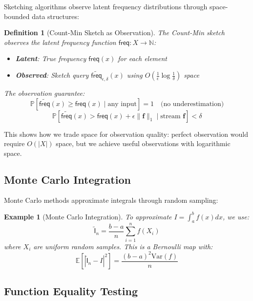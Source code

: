 \documentclass[11pt,final,hidelinks]{article}
\newtheorem{definition}[theorem]{Definition}
\newtheorem{example}[theorem]{Example}
\newcommand{\obs}[1]{\widetilde{#1}}  %
\newcommand{\AFun}[1]{\obs{\mathsf{#1}}}  %
\newcommand{\ProbCond}[2]{\mathbb{P}\left[#1 \mid #2\right]}
\newcommand{\Expect}[1]{\mathbb{E}\left[#1\right]}
\begin{document}
Sketching algorithms observe latent frequency distributions through space-bounded data structures:

\begin{definition}[Count-Min Sketch as Observation]
The Count-Min sketch \cite{cormode2005} observes the latent frequency function $\mathsf{freq} : X \to \mathbb{N}$:
\begin{itemize}
    \item \textbf{Latent}: True frequency $\mathsf{freq}(x)$ for each element
    \item \textbf{Observed}: Sketch query $\obs{\mathsf{freq}}_{\epsilon,\delta}(x)$ using $O(\frac{1}{\epsilon} \log \frac{1}{\delta})$ space
\end{itemize}
The observation guarantee:
\begin{equation}
\ProbCond{\obs{\mathsf{freq}}(x) \geq \mathsf{freq}(x)}{\text{any input}} = 1 \quad \text{(no underestimation)}
\end{equation}
\begin{equation}
\ProbCond{\obs{\mathsf{freq}}(x) > \mathsf{freq}(x) + \epsilon \|\mathbf{f}\|_1}{\text{stream } \mathbf{f}} < \delta
\end{equation}
\end{definition}

This shows how we trade space for observation quality: perfect observation would require $O(|X|)$ space, but we achieve useful observations with logarithmic space.

\subsection{Monte Carlo Integration}

Monte Carlo methods approximate integrals through random sampling:

\begin{example}[Monte Carlo Integration]
To approximate $I = \int_a^b f(x) dx$, we use:
\begin{equation}
\AFun{I}_n = \frac{b-a}{n} \sum_{i=1}^n f(X_i)
\end{equation}
where $X_i$ are uniform random samples. This is a Bernoulli map with:
\begin{equation}
\Expect{|\AFun{I}_n - I|^2} = \frac{(b-a)^2 \text{Var}(f)}{n}
\end{equation}
\end{example}

\subsection{Function Equality Testing}
\end{document}
